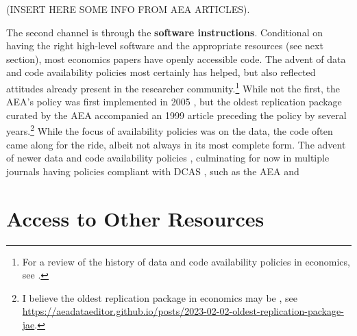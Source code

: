 \documentclass{article}
\begin{document}
(INSERT HERE SOME INFO FROM AEA ARTICLES). 


The second channel is through the \textbf{software instructions}. Conditional on having the right high-level software and the appropriate resources (see next section), most economics papers have openly accessible code. The advent of data and code availability policies most certainly has helped, but also reflected attitudes already present in the researcher community.\footnote{For a review of the history of data and code availability policies in economics, see \citet{vlaeminck_dawning_2021}.} While not the first, the AEA's policy was first implemented in 2005 \citep{bernanke_editorial_2004,american_economic_association_data_2005}, but the oldest replication package curated by the AEA accompanied an 1999 article \citep{frankel_does_1999,frankel_replication_1999} preceding the policy by several years.\footnote{I believe the oldest replication package in economics may be \citet{koenker_asymptotic_1988-1}, see \url{https://aeadataeditor.github.io/posts/2023-02-02-oldest-replication-package-jae}.} While the focus of availability policies was on the data, the code often came along for the ride, albeit not always in its most complete form. The advent of newer data and code availability policies \citep[for the AEA, ][]{AEA-announcement-July-2019,AEA-announcement-July-2019}, culminating for now in multiple journals having policies compliant with \ac{DCAS} \citep{koren_data_2022}, such as the AEA \citep{american_economic_association_data_2024} and




%


\section{Access to Other Resources}
\label{sec:other_resources}
\end{document}
